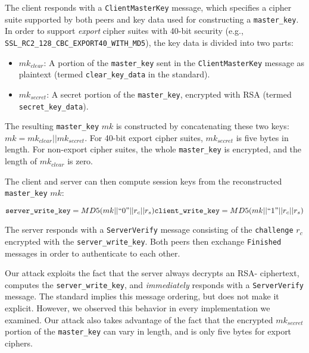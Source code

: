 The client responds with a \texttt{ClientMasterKey} message, which
specifies a cipher suite supported by both peers and key data
used for constructing a \texttt{master\_key}. In order to support
\textit{export} cipher suites with 40-bit security (e.g.,
\texttt{SSL\_RC2\_128\_CBC\_EXPORT40\_WITH\_MD5}), the key data is
divided into two parts:
\begin{itemize}
	\item $mk_{clear}$: A portion of the \texttt{master\_key} sent in the \texttt{ClientMasterKey} message as plaintext (termed \texttt{clear\_key\_data} in the \ssltwo standard).
	\item $mk_{secret}$: A secret portion of the
          \texttt{master\_key}, encrypted with RSA \PKCS (termed \texttt{secret\_key\_data}). 
\end{itemize}
The resulting \texttt{master\_key} $mk$ is constructed by
concatenating these two keys: $mk = mk_{clear} || mk_{secret}$. For
40-bit export cipher suites, $mk_{secret}$ is five bytes in length.
For non-export cipher suites, the whole \texttt{master\_key} is
encrypted, and the length of $mk_{clear}$ is zero.

The client and server can then compute session keys from the reconstructed \texttt{master\_key} $mk$:

\vspace{-6pt}
\begin{center}
\begin{math}
	\texttt{server\_write\_key} = MD5(mk || ``0" || r_c || r_s) \linebreak	
	\texttt{client\_write\_key} = MD5(mk || ``1" || r_c || r_s)
\end{math}
\end{center}
\vspace{-6pt}

The server responds with a \texttt{ServerVerify} message
consisting of the \texttt{challenge} $r_c$ encrypted with the
\texttt{server\_write\_key}.  Both peers then exchange
\texttt{Finished} messages in order to authenticate to each other.

Our attack exploits the fact that the server always decrypts an RSA-\PKCS
ciphertext, computes the \texttt{server\_write\_key}, and \textit{immediately}
responds with a \texttt{ServerVerify} message.  The \ssltwo standard
implies this message ordering, but does not make it explicit.
However, we observed this behavior in every implementation we
examined.  Our attack also takes advantage of the fact that the
encrypted $mk_{secret}$ portion of the \texttt{master\_key} can vary
in length, and is only five bytes for export ciphers.

